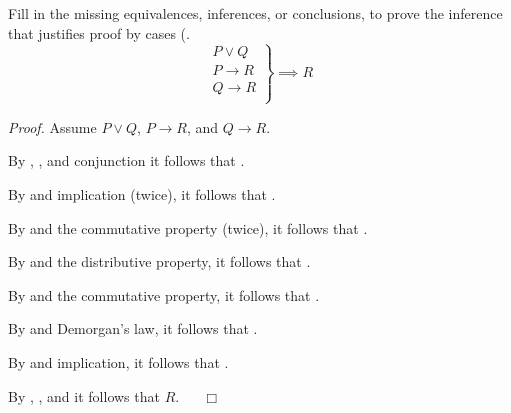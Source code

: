 \begin{exer}[\exerU] %
\label{exer_proof_equiv_infer_proof_by_cases}
    Fill in the missing equivalences, inferences, or conclusions, to prove the inference that justifies proof by cases (.  
        $$\left. \begin{array} {c}
            P \lor Q \\
            P \to R \\
            Q \to R \\
        \end{array} \right \} \implies R$$

         \emph{Proof.}  Assume  $P \lor Q$,  $P \to R$, and  $Q \to R$.  

         By , , and conjunction it follows that  \underline{\hspace{.75 in}}.

         By  and implication (twice), it follows that  \underline{\hspace{.75 in}}.

         By  and the commutative property (twice), it follows that
          \underline{\hspace{.75 in}}.

         By  and the distributive property, it follows that
          \underline{\hspace{.75 in}}.

         By  and the commutative property, it follows that
          \underline{\hspace{.75 in}}.

         By  and Demorgan's law, it follows that
          \underline{\hspace{.75 in}}.

         By  and implication, it follows that
          \underline{\hspace{.75 in}}.

         By , , and \underline{\hspace{.75 in}} it follows that $R$. ~ \hfill ~$\Box$ 
\end{exer}

